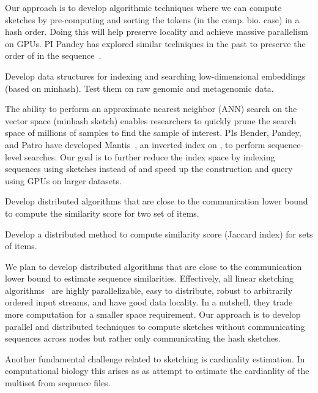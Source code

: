 Our approach is to develop algorithmic techniques where we can compute sketches by pre-computing and sorting the tokens (\kmers in the comp. bio. case) in a hash order. Doing this will help preserve locality and achieve massive parallelism on GPUs. PI Pandey has explored similar techniques in the past to preserve the order of \kmers in the sequence~\cite{Marais2019}.

\begin{rproblem}
Develop data structures for indexing and searching low-dimensional embeddings (based on minhash).  Test them on raw genomic and metagenomic data.
\end{rproblem}


The ability to perform an approximate nearest neighbor (ANN) search on the vector space (minhash sketch) enables researchers to quickly prune the search space of millions of samples to find the sample of interest. PIs  Bender, Pandey, and Patro have developed Mantis~\cite{PandeyAlBe18}, an inverted index on \kmers, to perform sequence-level searches. Our goal is to further reduce the index space by indexing sequences using sketches instead of \kmers and speed up the construction and query using GPUs on larger datasets.

\begin{rproblem}
Develop distributed algorithms that are close to the communication lower bound to  compute the similarity score for two set of items.
\end{rproblem}

\begin{rproblem}
Develop a distributed method to compute similarity score (Jaccard index) for sets of items.
\end{rproblem}

We plan to develop distributed algorithms that are close to the communication lower bound to estimate sequence similarities. Effectively, all linear sketching algorithms~\cite{li2014sketchuniversal} are highly parallelizable, easy to distribute, robust to arbitrarily ordered input streams, and have good data locality. In a nutshell, they trade more computation for a smaller space requirement. Our approach is to develop parallel and distributed techniques to compute sketches without communicating sequences across nodes but rather only communicating the hash sketches.

Another fundamental challenge related to sketching is cardinality estimation. In computational biology this arises as as attempt to estimate the cardianlity of the \kmer multiset from sequence files. 

